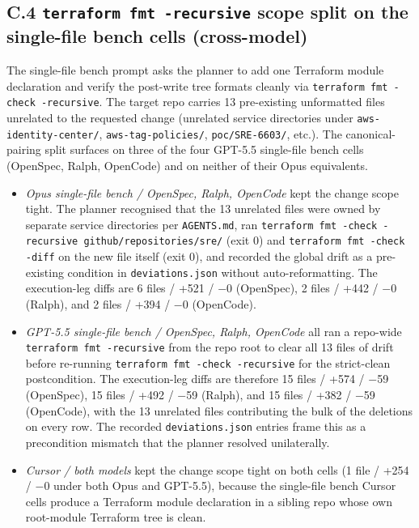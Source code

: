 \subsection*{C.4 \texttt{terraform fmt -recursive} scope split on the
single-file bench cells (cross-model)}

The single-file bench prompt asks the planner to add one Terraform module
declaration and verify the post-write tree formats cleanly via
\texttt{terraform fmt -check -recursive}. The target repo carries
13 pre-existing unformatted files unrelated to the requested change
(unrelated service directories under \texttt{aws-identity-center/},
\texttt{aws-tag-policies/}, \texttt{poc/SRE-6603/}, etc.). The
canonical-pairing split surfaces on three of the four GPT-5.5
single-file bench cells (OpenSpec, Ralph, OpenCode) and on neither of
their Opus equivalents.

\begin{itemize}
\item \emph{Opus single-file bench / OpenSpec, Ralph, OpenCode} kept the
change scope tight. The planner recognised that the 13 unrelated
files were owned by separate service directories per
\texttt{AGENTS.md}, ran
\texttt{terraform fmt -check -recursive github/repositories/sre/}
(exit 0) and \texttt{terraform fmt -check -diff} on the new file
itself (exit 0), and recorded the global drift as a pre-existing
condition in \texttt{deviations.json} without auto-reformatting.
The execution-leg diffs are 6 files / +521 / $-$0 (OpenSpec),
2 files / +442 / $-$0 (Ralph), and 2 files / +394 / $-$0 (OpenCode).
\item \emph{GPT-5.5 single-file bench / OpenSpec, Ralph, OpenCode} all
ran a repo-wide \texttt{terraform fmt -recursive} from the repo
root to clear all 13 files of drift before re-running
\texttt{terraform fmt -check -recursive} for the strict-clean
postcondition. The execution-leg diffs are therefore 15 files /
+574 / $-$59 (OpenSpec), 15 files / +492 / $-$59 (Ralph), and
15 files / +382 / $-$59 (OpenCode), with the 13 unrelated files
contributing the bulk of the deletions on every row. The recorded
\texttt{deviations.json} entries frame this as a precondition
mismatch that the planner resolved unilaterally.
\item \emph{Cursor / both models} kept the change scope tight on
both cells (1 file / +254 / $-$0 under both Opus and GPT-5.5),
because the single-file bench Cursor cells produce a Terraform module
declaration in a sibling repo whose own root-module Terraform tree
is clean.
\end{itemize}

